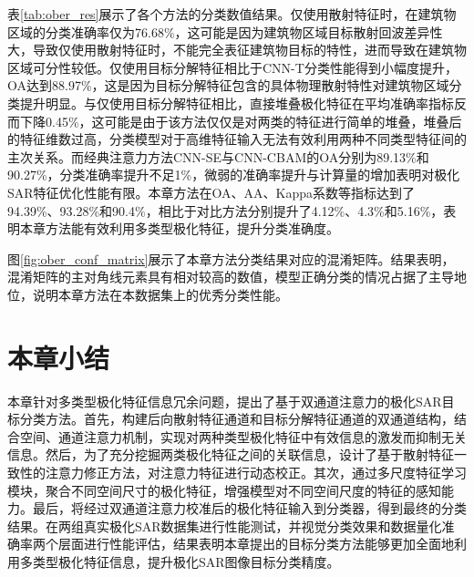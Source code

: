 表\ref{tab:ober_res}展示了各个方法的分类数值结果。仅使用散射特征时，在建筑物区域的分类准确率仅为76.68\%，这可能是因为建筑物区域目标散射回波差异性大，导致仅使用散射特征时，不能完全表征建筑物目标的特性，进而导致在建筑物区域可分性较低。仅使用目标分解特征相比于CNN-T分类性能得到小幅度提升，OA达到88.97\%，这是因为目标分解特征包含的具体物理散射特性对建筑物区域分类提升明显。与仅使用目标分解特征相比，直接堆叠极化特征在平均准确率指标反而下降0.45\%，这可能是由于该方法仅仅是对两类的特征进行简单的堆叠，堆叠后的特征维数过高，分类模型对于高维特征输入无法有效利用两种不同类型特征间的主次关系。而经典注意力方法CNN-SE与CNN-CBAM的OA分别为89.13\%和90.27\%，分类准确率提升不足1\%，微弱的准确率提升与计算量的增加表明对极化SAR特征优化性能有限。本章方法在OA、AA、Kappa系数等指标达到了94.39\%、93.28\%和90.4\%，相比于对比方法分别提升了4.12\%、4.3\%和5.16\%，表明本章方法能有效利用多类型极化特征，提升分类准确度。

图\ref{fig:ober_conf_matrix}展示了本章方法分类结果对应的混淆矩阵。结果表明，混淆矩阵的主对角线元素具有相对较高的数值，模型正确分类的情况占据了主导地位，说明本章方法在本数据集上的优秀分类性能。


\section{本章小结}
本章针对多类型极化特征信息冗余问题，提出了基于双通道注意力的极化SAR目标分类方法。首先，构建后向散射特征通道和目标分解特征通道的双通道结构，结合空间、通道注意力机制，实现对两种类型极化特征中有效信息的激发而抑制无关信息。然后，为了充分挖掘两类极化特征之间的关联信息，设计了基于散射特征一致性的注意力修正方法，对注意力特征进行动态校正。其次，通过多尺度特征学习模块，聚合不同空间尺寸的极化特征，增强模型对不同空间尺度的特征的感知能力。最后，将经过双通道注意力校准后的极化特征输入到分类器，得到最终的分类结果。在两组真实极化SAR数据集进行性能测试，并视觉分类效果和数据量化准确率两个层面进行性能评估，结果表明本章提出的目标分类方法能够更加全面地利用多类型极化特征信息，提升极化SAR图像目标分类精度。